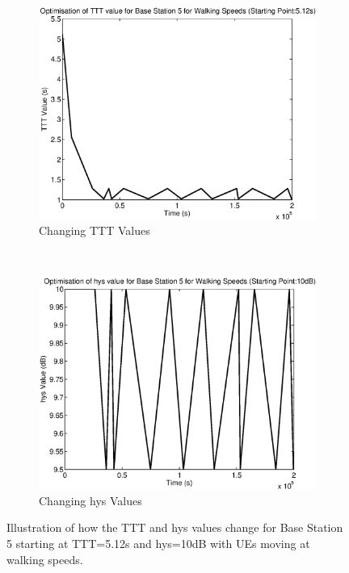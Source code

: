 \begin{figure}[H]
        \centering
        \begin{subfigure}[b]{0.49\textwidth}
                \includegraphics[width=\textwidth]{figures/graphs/walkhigh/TTT5.eps}
                \caption{Changing TTT Values}
        \end{subfigure}%
        ~ %
        \begin{subfigure}[b]{0.49\textwidth}
                \includegraphics[width=\textwidth]{figures/graphs/walkhigh/hys5.eps}
                \caption{Changing hys Values}
        \end{subfigure}
        \caption{Illustration of how the TTT and hys values change for Base Station 5 starting at TTT=5.12s and hys=10dB with UEs moving at walking speeds.}
\end{figure}
